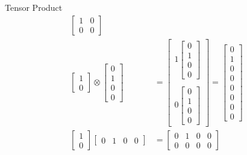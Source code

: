 \documentclass{beamer}
\begin{document}
\begin{frame}{Tensor Product}
{\begin{align*}
\begin{bmatrix}
                                                                                    1 & 0 \\
                                                                                    0 & 0
                                                                                  \end{bmatrix} \\
      \begin{bmatrix} 1 \\ 0 \end{bmatrix} \otimes \begin{bmatrix} 0 \\ 1 \\ 0 \\ 0 \end{bmatrix} &=
          \begin{bmatrix}
            1 \begin{bmatrix} 0 \\ 1 \\ 0 \\ 0 \end{bmatrix} \\
            \\
            0 \begin{bmatrix} 0 \\ 1 \\ 0 \\ 0 \end{bmatrix}
          \end{bmatrix}
          = \begin{bmatrix} 0 \\ 1 \\ 0 \\ 0 \\ 0 \\ 0 \\ 0 \\ 0 \end{bmatrix} \\
      \begin{bmatrix} 1 \\ 0 \end{bmatrix} \begin{bmatrix} 0 & 1 & 0 & 0 \end{bmatrix} &= \begin{bmatrix}
                                                                                            0 & 1 & 0 & 0\\
                                                                                            0 & 0 & 0 & 0
                                                                                          \end{bmatrix}
    \end{align*}
  }%
\end{frame}
\end{document}
